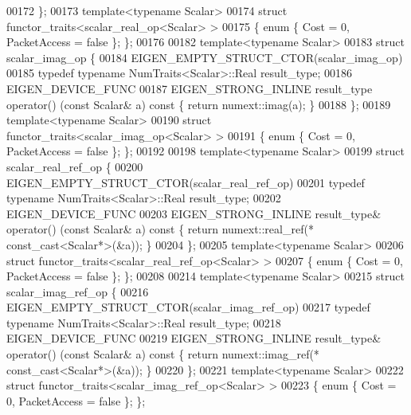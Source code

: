 \begin{DoxyCode}
00172 \};
00173 \textcolor{keyword}{template}<\textcolor{keyword}{typename} Scalar>
00174 \textcolor{keyword}{struct }functor\_traits<scalar\_real\_op<Scalar> >
00175 \{ \textcolor{keyword}{enum} \{ Cost = 0, PacketAccess = \textcolor{keyword}{false} \}; \};
00176 
00182 \textcolor{keyword}{template}<\textcolor{keyword}{typename} Scalar>
00183 \textcolor{keyword}{struct }scalar\_imag\_op \{
00184   EIGEN\_EMPTY\_STRUCT\_CTOR(scalar\_imag\_op)
00185   \textcolor{keyword}{typedef} \textcolor{keyword}{typename} NumTraits<Scalar>::Real result\_type;
00186   EIGEN\_DEVICE\_FUNC
00187   EIGEN\_STRONG\_INLINE result\_type operator() (\textcolor{keyword}{const} Scalar& a)\textcolor{keyword}{ const }\{ \textcolor{keywordflow}{return} numext::imag(a); \}
00188 \};
00189 \textcolor{keyword}{template}<\textcolor{keyword}{typename} Scalar>
00190 \textcolor{keyword}{struct }functor\_traits<scalar\_imag\_op<Scalar> >
00191 \{ \textcolor{keyword}{enum} \{ Cost = 0, PacketAccess = \textcolor{keyword}{false} \}; \};
00192 
00198 \textcolor{keyword}{template}<\textcolor{keyword}{typename} Scalar>
00199 \textcolor{keyword}{struct }scalar\_real\_ref\_op \{
00200   EIGEN\_EMPTY\_STRUCT\_CTOR(scalar\_real\_ref\_op)
00201   \textcolor{keyword}{typedef} \textcolor{keyword}{typename} NumTraits<Scalar>::Real result\_type;
00202   EIGEN\_DEVICE\_FUNC
00203   EIGEN\_STRONG\_INLINE result\_type& operator() (\textcolor{keyword}{const} Scalar& a)\textcolor{keyword}{ const }\{ \textcolor{keywordflow}{return} numext::real\_ref(*
      const\_cast<Scalar*>(&a)); \}
00204 \};
00205 \textcolor{keyword}{template}<\textcolor{keyword}{typename} Scalar>
00206 \textcolor{keyword}{struct }functor\_traits<scalar\_real\_ref\_op<Scalar> >
00207 \{ \textcolor{keyword}{enum} \{ Cost = 0, PacketAccess = \textcolor{keyword}{false} \}; \};
00208 
00214 \textcolor{keyword}{template}<\textcolor{keyword}{typename} Scalar>
00215 \textcolor{keyword}{struct }scalar\_imag\_ref\_op \{
00216   EIGEN\_EMPTY\_STRUCT\_CTOR(scalar\_imag\_ref\_op)
00217   \textcolor{keyword}{typedef} \textcolor{keyword}{typename} NumTraits<Scalar>::Real result\_type;
00218   EIGEN\_DEVICE\_FUNC
00219   EIGEN\_STRONG\_INLINE result\_type& operator() (\textcolor{keyword}{const} Scalar& a)\textcolor{keyword}{ const }\{ \textcolor{keywordflow}{return} numext::imag\_ref(*
      const\_cast<Scalar*>(&a)); \}
00220 \};
00221 \textcolor{keyword}{template}<\textcolor{keyword}{typename} Scalar>
00222 \textcolor{keyword}{struct }functor\_traits<scalar\_imag\_ref\_op<Scalar> >
00223 \{ \textcolor{keyword}{enum} \{ Cost = 0, PacketAccess = \textcolor{keyword}{false} \}; \};

\end{DoxyCode}
